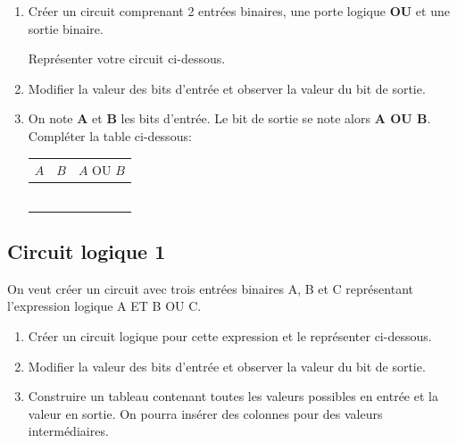\documentclass[11pt,a4paper]{article}
\begin{document}
\begin{enumerate}
\item Créer un circuit comprenant 2 entrées binaires, une porte logique \textbf{OU} et une sortie binaire.

Représenter votre circuit ci-dessous.\vspace{2cm}

\item Modifier la valeur des bits d'entrée et observer la valeur du bit de sortie.

\item On note \textbf{A} et \textbf{B} les bits d'entrée. Le bit de sortie se note alors \textbf{A OU B}. Compléter la table ci-dessous:

\begin{center}
\begin{tabular}{*{2}{|C{1cm}}|C{1.6cm}|}\hline
$A$ & $B$ & $A \text{~OU~} B$ \\\hline
 & & \\
 & & \\
 & & \\
  & & \\
 & & \\
 & & \\\hline
\end{tabular}
\end{center}
\end{enumerate}




\newpage


\subsection*{\Large Circuit logique 1}

On veut créer un circuit avec trois entrées binaires A, B et C représentant l'expression logique A ET B OU C.

\begin{enumerate}
\item Créer un circuit logique pour cette expression et le représenter ci-dessous. \vspace{3cm}

\item Modifier la valeur des bits d'entrée et observer la valeur du bit de sortie.

\item Construire un tableau contenant toutes les valeurs possibles en entrée et la valeur en sortie. On pourra insérer des colonnes pour des valeurs intermédiaires. \vspace{5cm}
\end{enumerate}
\end{document}
